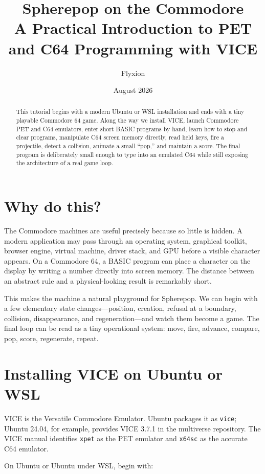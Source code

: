 \documentclass[11pt]{article}
\title{Spherepop on the Commodore\\\large A Practical Introduction to PET and C64 Programming with VICE}
\author{Flyxion}
\date{August 2026}
\begin{document}
\maketitle

\begin{abstract}
This tutorial begins with a modern Ubuntu or WSL installation and ends with a tiny playable Commodore 64 game. Along the way we install VICE, launch Commodore PET and C64 emulators, enter short BASIC programs by hand, learn how to stop and clear programs, manipulate C64 screen memory directly, read held keys, fire a projectile, detect a collision, animate a small ``pop,'' and maintain a score. The final program is deliberately small enough to type into an emulated C64 while still exposing the architecture of a real game loop.
\end{abstract}

\section{Why do this?}

The Commodore machines are useful precisely because so little is hidden. A modern application may pass through an operating system, graphical toolkit, browser engine, virtual machine, driver stack, and GPU before a visible character appears. On a Commodore 64, a BASIC program can place a character on the display by writing a number directly into screen memory. The distance between an abstract rule and a physical-looking result is remarkably short.

This makes the machine a natural playground for Spherepop. We can begin with a few elementary state changes---position, creation, refusal at a boundary, collision, disappearance, and regeneration---and watch them become a game. The final loop can be read as a tiny operational system: move, fire, advance, compare, pop, score, regenerate, repeat.

\section{Installing VICE on Ubuntu or WSL}

VICE is the Versatile Commodore Emulator. Ubuntu packages it as \texttt{vice}; Ubuntu 24.04, for example, provides VICE 3.7.1 in the multiverse repository. The VICE manual identifies \texttt{xpet} as the PET emulator and \texttt{x64sc} as the accurate C64 emulator.

On Ubuntu or Ubuntu under WSL, begin with:
\end{document}
